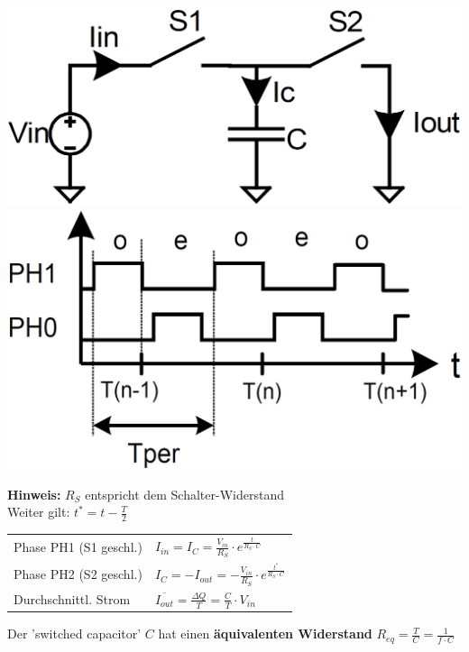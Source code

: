 \begin{minipage}[c]{0.28\columnwidth}
    \includegraphics[width=\columnwidth]{images/grundprinzip_switched_capacitor_schaltung.png}
    \vspace{0.2cm}
    \includegraphics[width=\columnwidth]{images/grundprinzip_switched_capacitor_timing.png}
\end{minipage}
\hfill
\begin{minipage}[c]{0.7\columnwidth}
    \textbf{Hinweis:} $R_S$ entspricht dem Schalter-Widerstand \\
    Weiter gilt: $t^* = t - \frac{T}{2}$

    \begin{tabular}{ll} %
        Phase PH1 (S1 geschl.)  & $I_{in} = I_C = \frac{V_{in}}{R_S} \cdot e^{\frac{t}{R_S \cdot C}} $ \\
        Phase PH2 (S2 geschl.)  & $I_C = - I_{out} = - \frac{V_{in}}{R_S} \cdot e^{\frac{t^*}{R_S \cdot C}}$ \\
        Durchschnittl. Strom    & $\overline{I_{out}} = \frac{\Delta Q}{T} =\frac{C}{T} \cdot V_{in}$ \\
    \end{tabular}

    Der 'switched capacitor' $C$ hat einen \textbf{äquivalenten Widerstand} $R_{eq} = \frac{T}{C} = \frac{1}{f \cdot C}$
\end{minipage}


